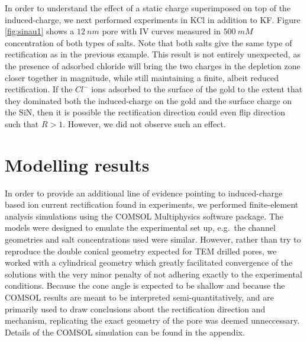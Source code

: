 		In order to understand the effect of a static charge superimposed on top of the induced-charge, we next performed experiments in KCl in addition to KF. Figure \ref{fig:sinau1} shows a $\SI{12}{nm}$ pore with IV curves measured in $\SI{500}{mM}$ concentration of both types of salts. Note that both salts give the same type of rectification as in the previous example. This result is not entirely unexpected, as the presence of adsorbed chloride will bring the two charges in the depletion zone closer together in magnitude, while still maintaining a finite, albeit reduced rectification. If the $Cl^{-}$ ions adsorbed to the surface of the gold to the extent that they dominated both the induced-charge on the gold and the surface charge on the SiN, then it is possible the rectification direction could even flip direction such that $R>1$. However, we did not observe such an effect.
		
	\section{Modelling results}
		
		In order to provide an additional line of evidence pointing to induced-charge based ion current rectification found in experiments, we performed finite-element analysis simulations using the COMSOL Multiphysics software package. The models were designed to emulate the experimental set up, e.g.~the channel geometries and salt concentrations used were similar. However, rather than try to reproduce the double conical geometry expected for TEM drilled pores, we worked with a cylindrical geometry which greatly facilitated convergence of the solutions with the very minor penalty of not adhering exactly to the experimental conditions. Because the cone angle is expected to be shallow and because the COMSOL results are meant to be interpreted semi-quantitatively, and are primarily used to draw conclusions about the rectification direction and mechanism, replicating the exact geometry of the pore was deemed unneccessary. Details of the COMSOL simulation can be found in the appendix.
		

